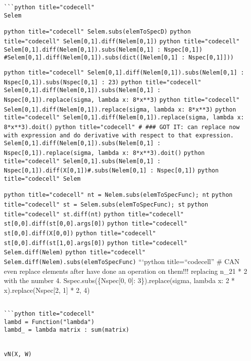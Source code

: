 \documentclass[
]{article}
\begin{document}
\begin{verbatim}
```python title="codecell"
Selem
\end{verbatim}

\texttt{python title="codecell" Selem.subs(elemToSpecD)}
\texttt{python title="codecell" Selem[0,1].diff(Nelem[0,1])}
\texttt{python title="codecell" Selem[0,1].diff(Nelem[0,1]).subs({Nelem[0,1] : Nspec[0,1]}) #Selem[0,1].diff(Nelem[0,1]).subs(dict([{Nelem[0,1] : Nspec[0,1]}]))}

\texttt{python title="codecell" Selem[0,1].diff(Nelem[0,1]).subs({Nelem[0,1] : Nspec[0,1]}).subs({Nspec[0,1] : 23})}
\texttt{python title="codecell" Selem[0,1].diff(Nelem[0,1]).subs({Nelem[0,1] : Nspec[0,1]}).replace(sigma, lambda x: 8*x**3)}
\texttt{python title="codecell" Selem[0,1].diff(Nelem[0,1]).replace(sigma, lambda x: 8*x**3)}
\texttt{python title="codecell" Selem[0,1].diff(Nelem[0,1]).replace(sigma, lambda x: 8*x**3).doit()}
\texttt{python title="codecell" # ### GOT IT: can replace now with expression and do derivative with respect to that expression. Selem[0,1].diff(Nelem[0,1]).subs({Nelem[0,1] : Nspec[0,1]}).replace(sigma, lambda x: 8*x**3).doit()}
\texttt{python title="codecell" Selem[0,1].subs({Nelem[0,1] : Nspec[0,1]}).diff(X[0,1])#.subs({Nelem[0,1] : Nspec[0,1]})}
\texttt{python title="codecell" Selem}

\texttt{python title="codecell" nt = Nelem.subs(elemToSpecFunc); nt}
\texttt{python title="codecell" st = Selem.subs(elemToSpecFunc); st}
\texttt{python title="codecell" st.diff(nt)}
\texttt{python title="codecell" st[0,0].diff(st[0,0].args[0])}
\texttt{python title="codecell" st[0,0].diff(X[0,0])}
\texttt{python title="codecell" st[0,0].diff(st[1,0].args[0])}
\texttt{python title="codecell" Selem.diff(Nelem)}
\texttt{python title="codecell" Selem.diff(Nelem).subs(elemToSpecFunc)}
```python title=``codecell'' \# CAN even replace elements after have
done an operation on them!!! replacing n\_21 * 2 with the number 4.
Sspec.subs(\{Nspec{[}0, 0{]}: 3\}).replace(sigma, lambda x: 2 *
x).replace(Nspec{[}2, 1{]} * 2, 4)

\begin{verbatim}

```python title="codecell"
lambd = Function("lambda")
lambd_ = lambda matrix : sum(matrix)


vN(X, W)
\end{verbatim}
\end{document}
